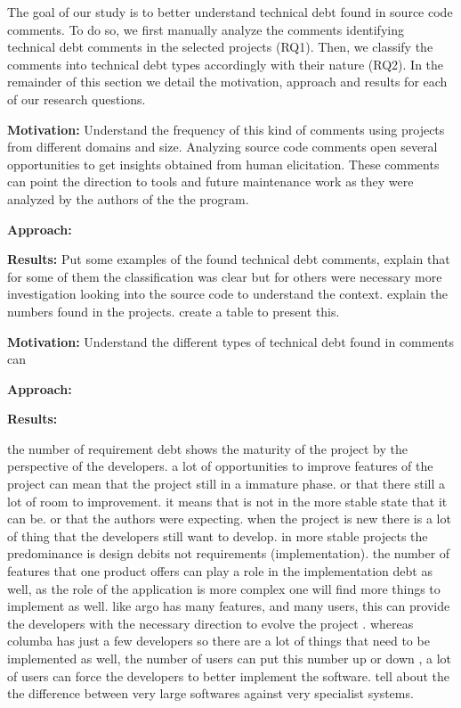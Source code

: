 The goal of our study is to better understand technical debt found in source code comments. To do so, we first manually analyze the comments identifying technical debt comments in the selected projects (RQ1). Then, we classify the comments into technical debt types accordingly with their nature (RQ2). In the remainder of this section we detail the motivation, approach and results for each of our research questions.  

\vspace{3mm}
\noindent\rqi
\vspace{3mm}

\noindent\textbf{Motivation:} Understand the frequency of this kind of comments using projects from different domains and size. Analyzing source code comments open several opportunities to get insights obtained from human elicitation. These comments can point the direction to tools and future maintenance work as they were analyzed by the authors of the the program. 

\vspace{1mm}
\noindent\textbf{Approach:} 

\vspace{1mm}
\noindent\textbf{Results:} Put some examples of the found technical debt comments, explain that for some of them the classification was clear but for others were necessary more investigation looking into the source code to understand the context. explain the numbers found in the projects. create a table to present this.

\vspace{3mm}
\noindent\rqii
\vspace{3mm}

\noindent\textbf{Motivation:} Understand the different types of technical debt found in comments can 

\vspace{1mm}
\noindent\textbf{Approach:}

\vspace{1mm}
\noindent\textbf{Results:}  


the number of requirement debt shows the maturity of the project by the perspective of the developers. a lot of opportunities to improve features of the project can mean that the project still in a immature phase. or that there still a lot of room to improvement. it means that is not in the more stable state that it can be. or that the authors were expecting. when the project is new there is a lot of thing that the developers still want to develop. in more stable projects the predominance is design debits not requirements (implementation). the number of features that one product offers can play a role in the implementation debt as well, as the role of the application is more complex one will find more things to implement as well. like argo has many features, and many users, this can provide the developers with the necessary direction to evolve the project . whereas columba has just a few developers so there are a lot of things that need to be implemented as well, the number of users can put this number up or down , a lot of users can force the developers to better implement the software. tell about the the difference between very large softwares against very specialist systems. 


